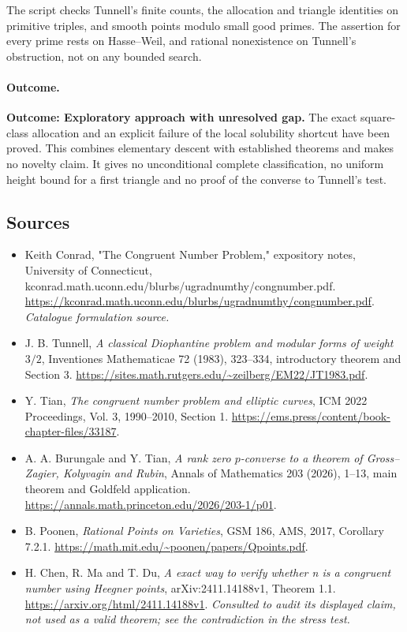 \documentclass[11pt,a4paper]{article}
\numberwithin{equation}{section}
\begin{document}
The script checks Tunnell's finite counts, the allocation and triangle
identities on primitive triples, and smooth points modulo small good primes.
The assertion for every prime rests on Hasse--Weil, and rational nonexistence
on Tunnell's obstruction, not on any bounded search.

\paragraph{Outcome.}
\textbf{Outcome: Exploratory approach with unresolved gap.}
The exact square-class allocation and an explicit failure of the local
solubility shortcut have been proved. This combines elementary descent with
established theorems and makes no novelty claim. It gives no unconditional
complete classification, no uniform height bound for a first triangle and
no proof of the converse to Tunnell's test.

\subsection{Sources}
\begin{itemize}\raggedright
\item[\textnormal{[S1]}]\hypertarget{source:statement:1}{} Keith Conrad, "The Congruent Number Problem," expository notes, University of Connecticut, kconrad.math.uconn.edu/blurbs/ugradnumthy/congnumber.pdf.
\url{https://kconrad.math.uconn.edu/blurbs/ugradnumthy/congnumber.pdf}.
{\small\textit{Catalogue formulation source.}}
\item[\textnormal{[E1]}]\hypertarget{extra:statement:1}{} J. B. Tunnell,
\emph{A classical Diophantine problem and modular forms of weight $3/2$},
Inventiones Mathematicae 72 (1983), 323--334, introductory theorem and Section 3.
\url{https://sites.math.rutgers.edu/~zeilberg/EM22/JT1983.pdf}.
\item[\textnormal{[E2]}]\hypertarget{extra:statement:2}{} Y. Tian,
\emph{The congruent number problem and elliptic curves}, ICM 2022 Proceedings,
Vol. 3, 1990--2010, Section 1.
\url{https://ems.press/content/book-chapter-files/33187}.
\item[\textnormal{[E3]}]\hypertarget{extra:statement:3}{} A. A. Burungale and Y. Tian,
\emph{A rank zero $p$-converse to a theorem of Gross--Zagier, Kolyvagin and
Rubin}, Annals of Mathematics 203 (2026), 1--13, main theorem and Goldfeld
application. \url{https://annals.math.princeton.edu/2026/203-1/p01}.
\item[\textnormal{[E4]}]\hypertarget{extra:statement:4}{} B. Poonen,
\emph{Rational Points on Varieties}, GSM 186, AMS, 2017, Corollary 7.2.1.
\url{https://math.mit.edu/~poonen/papers/Qpoints.pdf}.
\item[\textnormal{[E5]}]\hypertarget{extra:statement:5}{} H. Chen, R. Ma and T. Du,
\emph{A exact way to verify whether n is a congruent number using Heegner
points}, arXiv:2411.14188v1, Theorem 1.1.
\url{https://arxiv.org/html/2411.14188v1}.
{\small\textit{Consulted to audit its displayed claim, not used as a valid
theorem; see the contradiction in the stress test.}}

\end{itemize}
\end{document}
